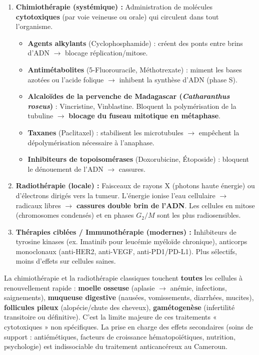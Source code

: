 \documentclass[11pt]{article}
\begin{document}
\begin{methode}
\begin{enumerate}
    \item \textbf{Chimiothérapie (systémique) :} Administration de molécules \textbf{cytotoxiques} (par voie veineuse ou orale) qui circulent dans tout l'organisme.
        \begin{itemize}
            \item \textbf{Agents alkylants} (Cyclophosphamide) : créent des ponts entre brins d'ADN $\rightarrow$ blocage réplication/mitose.
            \item \textbf{Antimétabolites} (5-Fluorouracile, Méthotrexate) : miment les bases azotées ou l'acide folique $\rightarrow$ inhibent la synthèse d'ADN (phase S).
            \item \textbf{Alcaloïdes de la pervenche de Madagascar (\emph{Catharanthus roseus})} : Vincristine, Vinblastine. Bloquent la polymérisation de la tubuline $\rightarrow$ \textbf{blocage du fuseau mitotique en métaphase}.
            \item \textbf{Taxanes} (Paclitaxel) : stabilisent les microtubules $\rightarrow$ empêchent la dépolymérisation nécessaire à l'anaphase.
            \item \textbf{Inhibiteurs de topoisomérases} (Doxorubicine, Étoposide) : bloquent le dénouement de l'ADN $\rightarrow$ cassures.
        \end{itemize}
    \item \textbf{Radiothérapie (locale) :} Faisceaux de rayons X (photons haute énergie) ou d'électrons dirigés vers la tumeur. L'énergie ionise l'eau cellulaire $\rightarrow$ radicaux libres $\rightarrow$ \textbf{cassures double brin de l'ADN}. Les cellules en mitose (chromosomes condensés) et en phases $G_2/M$ sont les plus radiosensibles.
    \item \textbf{Thérapies ciblées / Immunothérapie (modernes) :} Inhibiteurs de tyrosine kinases (ex. Imatinib pour leucémie myéloïde chronique), anticorps monoclonaux (anti-HER2, anti-VEGF, anti-PD1/PD-L1). Plus sélectifs, moins d'effets sur cellules saines.
\end{enumerate}
\end{methode}

\begin{attention}
La chimiothérapie et la radiothérapie classiques touchent \textbf{toutes} les cellules à renouvellement rapide : \textbf{moelle osseuse} (aplasie $\rightarrow$ anémie, infections, saignements), \textbf{muqueuse digestive} (nausées, vomissements, diarrhées, mucites), \textbf{follicules pileux} (alopécie/chute des cheveux), \textbf{gamétogenèse} (infertilité transitoire ou définitive). C'est la limite majeure de ces traitements « cytotoxiques » non spécifiques. La prise en charge des effets secondaires (soins de support : antiémétiques, facteurs de croissance hématopoïétiques, nutrition, psychologie) est indissociable du traitement anticancéreux au Cameroun.
\end{attention}
\end{document}

